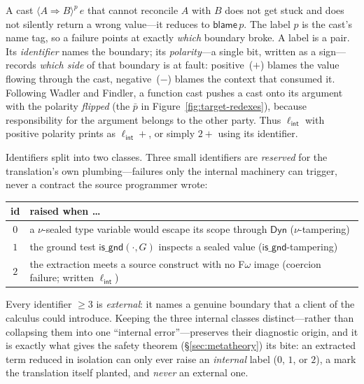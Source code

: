 \documentclass[acmsmall,anonymous=false,nonacm]{acmart}
\newcommand{\dyn}{\ensuremath{\mathsf{Dyn}}}
\newcommand{\cast}[4]{\langle #2 \Rightarrow #3 \rangle^{#4}\, #1}
\newcommand{\isgnd}[2]{\mathsf{is\_gnd}(#1, #2)}
\newcommand{\blame}[1]{\mathsf{blame}\,#1}
\newcommand{\lint}{\ell_{\mathsf{int}}}
\begin{document}
A cast $\cast{e}{A}{B}{p}$ that cannot reconcile $A$ with $B$ does not get
stuck and does not silently return a wrong value---it reduces to $\blame p$.
The label $p$ is the cast's name tag, so a failure points at exactly
\emph{which} boundary broke. A label is a pair. Its \emph{identifier} names
the boundary; its \emph{polarity}---a single bit, written as a sign---records
\emph{which side} of that boundary is at fault: positive~($+$) blames the
value flowing through the cast, negative~($-$) blames the context that
consumed it. Following Wadler and Findler, a function cast pushes a cast onto
its argument with the polarity \emph{flipped} (the $\bar p$ in
Figure~\ref{fig:target-redexes}), because responsibility for the argument
belongs to the other party. Thus $\lint$ with positive polarity prints as
$\lint{+}$, or simply $2{+}$ using its identifier.

Identifiers split into two classes. Three small identifiers are
\emph{reserved} for the translation's own plumbing---failures only the
internal machinery can trigger, never a contract the source programmer wrote:
\begin{center}
\begin{tabular}{cl}
\toprule
id & raised when \ldots \\
\midrule
$0$ & a $\nu$-sealed type variable would escape its scope through $\dyn$ \quad($\nu$-tampering) \\
$1$ & the ground test $\isgnd{\cdot}{G}$ inspects a sealed value \quad($\mathsf{is\_gnd}$-tampering) \\
$2$ & the extraction meets a source construct with no F$\omega$ image \quad(coercion failure; written $\lint$) \\
\bottomrule
\end{tabular}
\end{center}
Every identifier $\ge 3$ is \emph{external}: it names a genuine boundary that
a client of the calculus could introduce. Keeping the three internal classes
distinct---rather than collapsing them into one ``internal error''---preserves
their diagnostic origin, and it is exactly what gives the safety theorem
(\S\ref{sec:metatheory}) its bite: an extracted term reduced in isolation can
only ever raise an \emph{internal} label ($0$, $1$, or $2$), a mark the
translation itself planted, and \emph{never} an external one.
\end{document}
